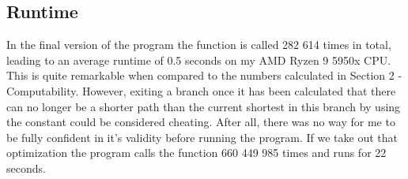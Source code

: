 \documentclass[12pt]{article} %
\begin{document}
\subsection{Runtime}
In the final version of the program the  function is called  282 614 times in total, leading to an average runtime of 0.5 seconds on my AMD Ryzen 9 5950x CPU. This is quite remarkable when compared to the numbers calculated in Section 2 - Computability. However, exiting a branch once it has been calculated that there can no longer be a shorter path than the current shortest in this branch by using the   constant could be considered cheating. After all, there was no way for me to be fully confident in it's validity before running the program.
If we take out that optimization the program calls the function 660 449 985 times and runs for 22 seconds.
\end{document}
